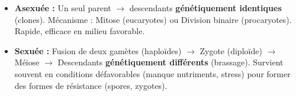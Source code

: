\documentclass[11pt]{article}
\begin{document}
\begin{definition}
    \begin{itemize}
        \item \textbf{Asexuée :} Un seul parent $\rightarrow$ descendants \textbf{génétiquement identiques} (clones). Mécanisme : Mitose (eucaryotes) ou Division binaire (procaryotes). Rapide, efficace en milieu favorable.
        \item \textbf{Sexuée :} Fusion de deux gamètes (haploïdes) $\rightarrow$ Zygote (diploïde) $\rightarrow$ Méiose $\rightarrow$ Descendants \textbf{génétiquement différents} (brassage). Survient souvent en conditions défavorables (manque nutriments, stress) pour former des formes de résistance (spores, zygotes).
    \end{itemize}
\end{definition}
\end{document}
